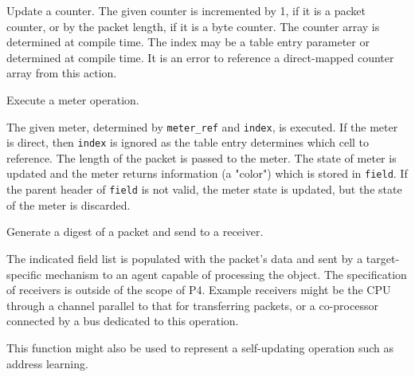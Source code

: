 \documentclass[12pt]{article}
\begin{document}

{ %
Update a counter.
}
{ %
}
{ %
The given counter is incremented by 1, if it is a packet counter, or by the 
packet length, if it is a byte counter.  The counter array is determined 
at compile time.  The index may be a table entry parameter or determined at 
compile time. It is an error to reference a direct-mapped counter array from 
this action.
}


{ %
Execute a meter operation.
}
{ %
}
{ %
The given meter, determined by \texttt{meter_ref} and \texttt{index}, is executed. If the 
meter is direct, then \texttt{index} is ignored as the table entry determines which 
cell to reference. The length of the packet is passed to the meter. The state 
of meter is updated and the meter returns information (a "color") which is 
stored in \texttt{field}. If the parent header of \texttt{field} is not valid, the meter 
state is updated, but the state of the meter is discarded.

}


{ %
Generate a digest of a packet and send to a receiver.
}
{ %
}
{ %
The indicated field list is populated with the packet's data and sent by 
a target-specific mechanism to an agent capable of processing the object. 
 The specification of receivers is outside of the scope of P4. Example receivers 
might be the CPU through a channel parallel to that for transferring packets, 
or a co-processor connected by a bus dedicated to this operation. 

This function might also be used to represent a self-updating operation such 
as address learning.
}
\end{document}
